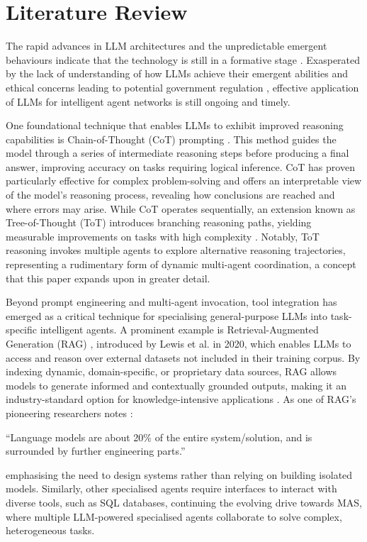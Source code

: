 \documentclass{article}
\begin{document}
\section{Literature Review} \label{sect:litrev}

The rapid advances in LLM architectures and the unpredictable emergent behaviours indicate that the technology is still in a formative stage \cite{berti2025emergent}. Exasperated by the lack of understanding of how LLMs achieve their emergent abilities \cite{singh2024rethinking} and ethical concerns leading to potential government regulation \cite{mesko2023imperative}, effective application of LLMs for intelligent agent networks is still ongoing and timely.

One foundational technique that enables LLMs to exhibit improved reasoning capabilities is Chain-of-Thought (CoT) prompting \cite{wei2022chain}. This method guides the model through a series of intermediate reasoning steps before producing a final answer, improving accuracy on tasks requiring logical inference. CoT has proven particularly effective for complex problem-solving and offers an interpretable view of the model’s reasoning process, revealing how conclusions are reached and where errors may arise. While CoT operates sequentially, an extension known as Tree-of-Thought (ToT) introduces branching reasoning paths, yielding measurable improvements on tasks with high complexity \cite{yao2024tree}. Notably, ToT reasoning invokes multiple agents to explore alternative reasoning trajectories, representing a rudimentary form of dynamic multi-agent coordination, a concept that this paper expands upon in greater detail.

Beyond prompt engineering and multi-agent invocation, tool integration has emerged as a critical technique for specialising general-purpose LLMs into task-specific intelligent agents. A prominent example is Retrieval-Augmented Generation (RAG) \cite{lewis2020retrieval}, introduced by Lewis et al. in 2020, which enables LLMs to access and reason over external datasets not included in their training corpus. By indexing dynamic, domain-specific, or proprietary data sources, RAG allows models to generate informed and contextually grounded outputs, making it an industry-standard option for knowledge-intensive applications \cite{oche2025systematic}. As one of RAG’s pioneering researchers notes \cite{Kiela2024RAG}:
\begin{displayquote}
``Language models are about 20\% of the entire system/solution, and is surrounded by further engineering parts.''
\end{displayquote}
emphasising the need to design systems rather than relying on building isolated models. Similarly, other specialised agents require interfaces to interact with diverse tools, such as SQL databases, continuing the evolving drive towards MAS, where multiple LLM-powered specialised agents collaborate to solve complex, heterogeneous tasks.
\end{document}
